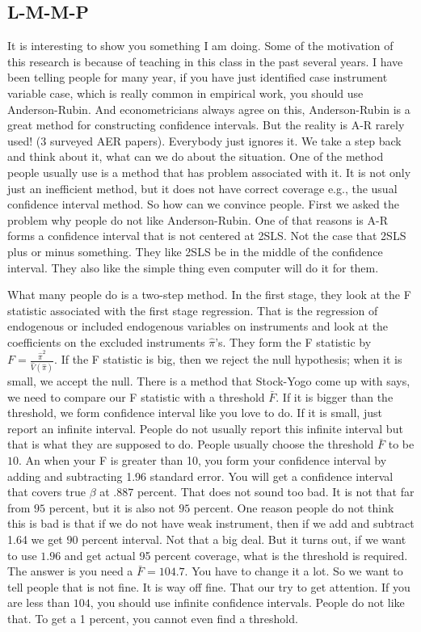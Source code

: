 \documentclass[11pt,a4paper]{amsart}
\theoremstyle{plain}
\theoremstyle{definition}
\begin{document}
\subsection{L-M-M-P}
	It is interesting to show you something I am doing. Some of the motivation of this research is because of teaching in this class in the past several years. I have been telling people for many year, if you have just identified case instrument variable case, which is really common in empirical work, you should use Anderson-Rubin. And econometricians  always agree on this, Anderson-Rubin is a great method for constructing confidence intervals. But the reality is A-R rarely used! (3 surveyed AER papers). Everybody just ignores it. We take a step back and think about it, what can we do about the situation. One of the method people usually use is a method that has problem associated with it. It is not only just an inefficient method, but it does not have correct coverage e.g., the usual confidence interval method. So how can we convince people. First we asked the problem why people do not like Anderson-Rubin. One of that reasons is A-R forms a confidence interval that is not centered at 2SLS. Not the case that 2SLS plus or minus something. They like 2SLS be in the middle of the confidence interval. They also like the simple thing even computer will do it for them.\par 
	What many people do is a two-step method. In the first stage, they look at the F statistic associated with the first stage regression. That is the regression of endogenous or included endogenous variables on instruments and look at the coefficients on the excluded instruments $\hat{\pi}$'s. They form the F statistic by $F=\frac{\hat{\pi}^{2}}{\hat{V}(\hat{\pi})}$. If the F statistic is big, then we reject the null hypothesis; when it is small, we accept the null. There is a method that Stock-Yogo come up with says, we need to compare our F statistic with a threshold $\bar{F}$. If it is bigger than the threshold, we form confidence interval like you love to do. If it is small, just report an infinite interval. People do not usually report this infinite interval but that is what they are supposed to do. People usually choose the threshold $\bar{F}$ to be $10$. An when your F is greater than 10, you form your confidence interval by adding and subtracting 1.96 standard error. You will get a confidence interval that covers true $\beta$ at $.887$ percent. That does not sound too bad. It is not that far from $95$ percent, but it is also not $95$ percent. One reason people do not think this is bad is that if we do not have weak instrument, then if we add and  subtract 1.64 we get $90$ percent interval. Not that a big deal. But it turns out, if we want to use $1.96$ and get actual 95 percent coverage, what is the threshold is required. The answer is you need a $\bar{F} = 104.7$. You have to change it a lot. So we want to tell people that is not fine. It is way off fine. That our try to get attention. If you are less than $104$, you should use infinite confidence intervals. People do not like that. To get a 1 percent, you cannot even find a threshold. \par 
\end{document}
